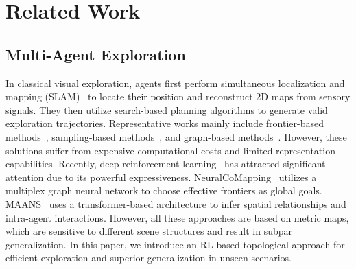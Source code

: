 \section{Related Work}

\subsection{Multi-Agent Exploration} 
In classical visual exploration, agents first perform simultaneous localization and mapping (SLAM)~\cite{SLAM1} to locate their position and reconstruct 2D maps from sensory signals. They then utilize search-based planning algorithms to generate valid exploration trajectories. Representative works mainly include frontier-based methods~\cite{RRT,CoScan}, sampling-based methods~\cite{sample1,sample2}, and graph-based methods~\cite{normalized_frontier,Voronoi}. However, these solutions suffer from expensive computational costs and limited representation capabilities. Recently, deep reinforcement learning~\cite{cvpr22,RL_multi2, yang2023learning} has attracted significant attention due to its powerful expressiveness. 
NeuralCoMapping~\cite{cvpr22} utilizes a multiplex graph neural network to choose effective frontiers as global goals. MAANS~\cite{RL_multi2} uses a transformer-based architecture to infer spatial relationships and intra-agent interactions. However, all these approaches are based on metric maps, which are sensitive to different scene structures and result in subpar generalization. In this paper, we introduce an RL-based topological approach for efficient exploration and superior generalization in unseen scenarios.





